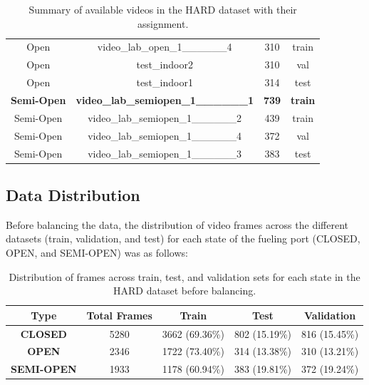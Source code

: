 \documentclass[12pt,oneside]{book} %
\begin{document}
\begin{table}[H]
\begin{tabular}{@{}cccc@{}}
        Open               & video\_lab\_open\_1\_\_\_\_\_\_4              & 310                       & train               \\
        Open               & test\_indoor2                                 & 310                       & val                 \\
        Open               & test\_indoor1                                 & 314                       & test                \\
        \textbf{Semi-Open} & \textbf{video\_lab\_semiopen\_1\_\_\_\_\_\_1} & \textbf{739}              & \textbf{train}      \\
        Semi-Open          & video\_lab\_semiopen\_1\_\_\_\_\_\_2          & 439                       & train               \\
        Semi-Open          & video\_lab\_semiopen\_1\_\_\_\_\_\_4          & 372                       & val                 \\ 
        Semi-Open          & video\_lab\_semiopen\_1\_\_\_\_\_\_3          & 383                       & test                \\ \bottomrule
    \end{tabular}
    \caption{\centering Summary of available videos in the HARD dataset with their assignment.}
    \label{tab:video_summary}
\end{table}

\newpage
\subsection{Data Distribution}
Before balancing the data, the distribution of video frames across the
different datasets (train, validation, and test) for each state of the fueling
port (CLOSED, OPEN, and SEMI-OPEN) was as follows:
\begin{table}[H]
    \centering
    \begin{tabular}{@{}ccccc@{}}
        \toprule
        \textbf{Type}      & \textbf{Total Frames} & \textbf{Train} & \textbf{Test} & \textbf{Validation} \\ \midrule
        \textbf{CLOSED}    & 5280                  & 3662 (69.36\%) & 802 (15.19\%) & 816 (15.45\%)       \\ 
        \textbf{OPEN}      & 2346                  & 1722 (73.40\%) & 314 (13.38\%) & 310 (13.21\%)       \\ 
        \textbf{SEMI-OPEN} & 1933                  & 1178 (60.94\%) & 383 (19.81\%) & 372 (19.24\%)       \\ \bottomrule
    \end{tabular}
    \caption{\centering Distribution of frames across train, test, and validation sets for each state in the HARD dataset before balancing.}
    \label{tab:frame_distribution}
\end{table}
\end{document}
